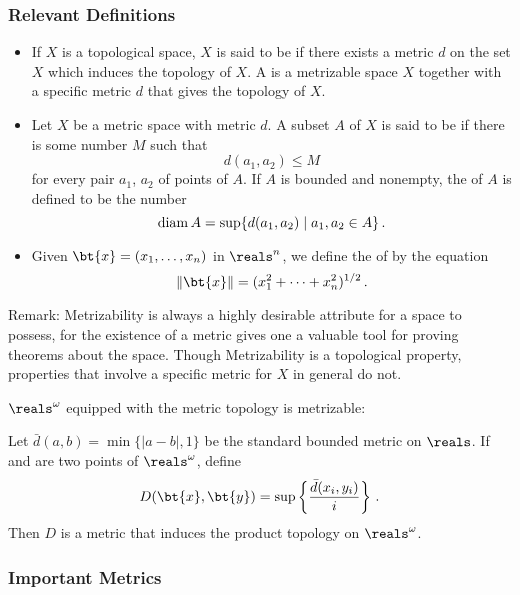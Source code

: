 
\subsubsection{Relevant Definitions}

\begin{itemize}
	\item If $X$ is a topological space, $X$ is said to be 
	 if there exists a 
	metric $d$ on the set $X$ which induces the topology of $X$. A 
	 is a metrizable 
	space $X$ together with a specific metric $d$ that gives the 
	topology of $X$.
	
	\item Let $X$ be a metric space with metric $d$. A subset $A$ 
	of $X$ is said to be  if there is some number $M$ 
	such that
	\[
		d(a_1,a_2) \leq M
	\]
	for every pair $a_1$, $a_2$ of points of $A$. If $A$ is bounded 
	and nonempty, the  of $A$ is defined to be the 
	number 
	\[
		\operatorname{diam} A = \sup \{ d(a_1,a_2) \mid a_1,a_2 \in A \}\,.
	\]
	
	\item Given $\bt{x} = (x_1, \dots, x_n)$ in $\reals^n$, we 
	define the  of  by the equation 
	\[
		\| \bt{x} \| = (x_1^2 + \dots + x_n^2)^{1/2}\,.
	\]
\end{itemize}
	
Remark: Metrizability is always a highly desirable attribute for a 
space to possess, for the existence of a metric gives one a 
valuable tool for proving theorems about the space. Though 
Metrizability is a topological property, properties that involve a 
specific metric for $X$ in general do not.

$\reals^\omega$ equipped with the metric topology is metrizable:

\begin{theorem}
	Let $\bar{d}(a,b) = \min \{ |a-b|, 1 \}$ be the standard 
	bounded metric on $\reals$. If  and  are two points 
	of $\reals^\omega$, define
	\[
		D(\bt{x}, \bt{y}) = \sup \left\{ \frac{\bar{d}(x_i,y_i)}{i} 
		\right\}\,.
	\]
	Then $D$ is a metric that induces the product topology on 
	$\reals^\omega$.
\end{theorem}


\subsubsection{Important Metrics}

